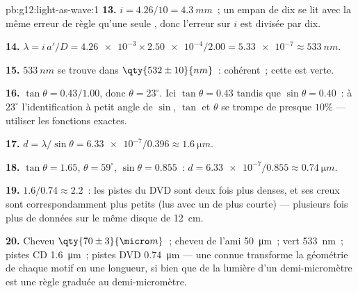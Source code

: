 \begin{solution}{pb:g12:light-as-wave:1}
\textbf{13.} $i = 4.26/10 = \qty{4.3}{mm}$~; un empan de dix se lit
avec la même erreur de règle qu'une seule , donc
l'erreur sur $i$ est divisée par dix.

\textbf{14.} $\lambda = i\,a'/D = \num{4.26e-3} \times
\num{2.50e-4}/2.00 = \num{5.33e-7} \approx \qty{533}{nm}$.

\textbf{15.} $\qty{533}{nm}$ se trouve dans $\qty{532 \pm 10}{nm}$~:
cohérent~; cette  est verte.

\textbf{16.} $\tan\theta = 0.43/1.00$, donc $\theta = 23^\circ$. Ici
$\tan\theta = 0.43$ tandis que $\sin\theta = 0.40$~: à $23^\circ$
l'identification à petit angle de $\sin$, $\tan$ et $\theta$ se trompe
de presque $10\%$ --- utiliser les fonctions exactes.

\textbf{17.} $d = \lambda/\sin\theta = \num{6.33e-7}/0.396 \approx
\qty{1.6}{\micro m}$.

\textbf{18.} $\tan\theta = 1.65$, $\theta = 59^\circ$,
$\sin\theta = 0.855$~: $d = \num{6.33e-7}/0.855 \approx
\qty{0.74}{\micro m}$.

\textbf{19.} $1.6/0.74 \approx 2.2$~: les pistes du DVD sont deux fois
plus denses, et ses creux sont correspondamment plus petits (lus avec un
 de  plus courte) --- plusieurs
fois plus de données sur le même disque de \qty{12}{cm}.

\textbf{20.} Cheveu $\qty{70 \pm 3}{\micro m}$~; cheveu de l'ami
\qty{50}{\micro m}~;  vert \qty{533}{nm}~; pistes CD
\qty{1.6}{\micro m}~; pistes DVD \qty{0.74}{\micro m} --- une
 connue transforme la géométrie de chaque
motif en une longueur, si bien que de la lumière d'un demi-micromètre
est une règle graduée au demi-micromètre.
\end{solution}
